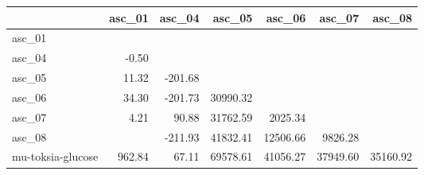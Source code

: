 \begin{tabular}{lrrrrrr}
\toprule
 & asc_01 & asc_04 & asc_05 & asc_06 & asc_07 & asc_08 \\
\midrule
asc_01 &  &  &  &  &  &  \\
asc_04 & -0.50 &  &  &  &  &  \\
asc_05 & 11.32 & -201.68 &  &  &  &  \\
asc_06 & 34.30 & -201.73 & 30990.32 &  &  &  \\
asc_07 & 4.21 & 90.88 & 31762.59 & 2025.34 &  &  \\
asc_08 &  & -211.93 & 41832.41 & 12506.66 & 9826.28 &  \\
mu-toksia-glucose & 962.84 & 67.11 & 69578.61 & 41056.27 & 37949.60 & 35160.92 \\
\bottomrule
\end{tabular}
